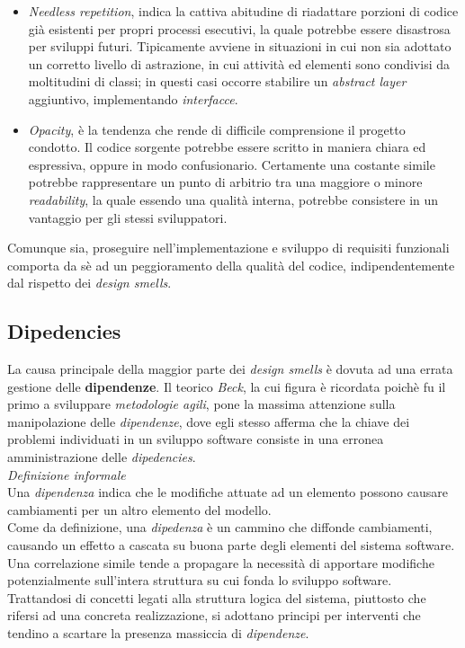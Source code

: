 \documentclass{article}
\begin{document}
\begin{itemize}[label={-}]
    \item \textit{Needless repetition}, indica la cattiva abitudine di riadattare porzioni di codice già esistenti per propri processi esecutivi, la quale potrebbe essere disastrosa per sviluppi futuri. Tipicamente avviene in situazioni in cui non sia adottato un corretto livello di astrazione, in cui attività ed elementi sono condivisi da moltitudini di classi; in questi casi occorre stabilire un \textit{abstract layer} aggiuntivo, implementando \textit{interfacce}.
    \item \textit{Opacity}, è la tendenza che rende di difficile comprensione il progetto condotto. Il codice sorgente potrebbe essere scritto in maniera chiara ed espressiva, oppure in modo confusionario. Certamente una costante simile potrebbe rappresentare un punto di arbitrio tra una maggiore o minore \textit{readability}, la quale essendo una qualità interna, potrebbe consistere in un vantaggio per gli stessi sviluppatori. 
\end{itemize}
Comunque sia, proseguire nell'implementazione e sviluppo di requisiti funzionali comporta da sè ad un peggioramento della qualità del codice, indipendentemente dal rispetto dei \textit{design smells}.
\subsection*{Dipedencies}
\large
La causa principale della maggior parte dei \textit{design smells} è dovuta ad una errata gestione delle \textbf{dipendenze}. Il teorico \textit{Beck}, la cui figura è ricordata poichè fu il primo a sviluppare \textit{metodologie agili}, pone la massima attenzione sulla manipolazione delle \textit{dipendenze}, dove egli stesso afferma che la chiave dei problemi individuati in un sviluppo software consiste in una erronea amministrazione delle \textit{dipedencies}.\vspace*{14pt}\\
\textit{Definizione informale}\\
Una \textit{dipendenza} indica che le modifiche attuate ad un elemento possono causare cambiamenti per un altro elemento del modello.\vspace*{14pt}\\
Come da definizione, una \textit{dipedenza} è un cammino che diffonde cambiamenti, causando un effetto a cascata su buona parte degli elementi del sistema software. Una correlazione simile tende a propagare la necessità di apportare modifiche potenzialmente sull'intera struttura su cui fonda lo sviluppo software.\vspace*{14pt}\\
Trattandosi di concetti legati alla struttura logica del sistema, piuttosto che rifersi ad una concreta realizzazione, si adottano principi per interventi che tendino a scartare la presenza massiccia di \textit{dipendenze}.
\end{document}
